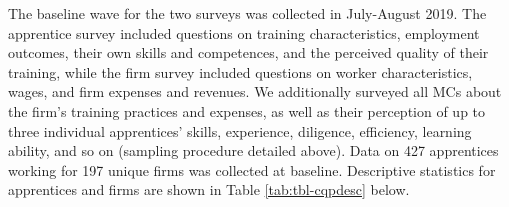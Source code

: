 \documentclass[
  a4paper, twoside, 12pt]{book}
\begin{document}
\onehalfspacing

The baseline wave for the two surveys was collected in July-August 2019. The apprentice survey included questions on training characteristics, employment outcomes, their own skills and competences, and the perceived quality of their training, while the firm survey included questions on worker characteristics, wages, and firm expenses and revenues. We additionally surveyed all MCs about the firm's training practices and expenses, as well as their perception of up to three individual apprentices' skills, experience, diligence, efficiency, learning ability, and so on (sampling procedure detailed above). Data on 427 apprentices working for 197 unique firms was collected at baseline. Descriptive statistics for apprentices and firms are shown in Table \ref{tab:tbl-cqpdesc} below.
\end{document}
